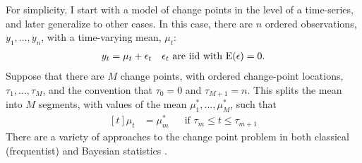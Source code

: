 For simplicity, I start with a model of change points in the level of a time-series, and later generalize to other cases.
In this case, there are $n$ ordered observations, $y_{1}, \dots, y_{n}$, with a time-varying mean, $\mu_{t}$:
\begin{equation}
  \label{dlm:eq:17}
  \begin{aligned}[t]
    y_{t} & = \mu_{t} + \epsilon_{t} && \text{$\epsilon_{t}$ are iid with $\operatorname{E}(\epsilon) = 0$.} \\  
  \end{aligned}
\end{equation}
Suppose that there are $M$ change points, with ordered change-point locations, $\tau_{1}, \dots, \tau_{M}$, and the convention that $\tau_{0} = 0$ and $\tau_{M + 1} = n$.
This splits the mean into $M$ segments, with values of the mean $\mu^{*}_{1}, \dots, \mu^{*}_{M}$,  such that
\begin{equation}
  \label{dlm:eq:1}
  \begin{aligned}[t]
    \mu_{t} &= \mu^{*}_{m} && \text{if $\tau_{m} \leq t \leq \tau_{m + 1}$}
  \end{aligned}
\end{equation}
There are a variety of approaches to the change point problem in both classical (frequentist) \parencites{Page1954a}{Hinkley1970a}{BaiPerron2003a}{OlshenVenkatramanLucitoEtAl2004}{BaiPerron1998}{KillickFearnheadEckley2012} and Bayesian statistics \parencites{Yao1984}{BarryHartigan1993}{Chib1998}{Fearnhead2006a}{FearnheadLiu2007a}.

